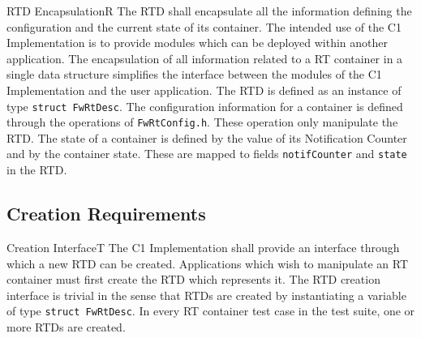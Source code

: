 \documentclass[a4paper,10pt]{article}
\newenvironment{fw_req}[6]
{\addtocounter{subsubsection}{1}
	\hspace{0.2cm}\textbf{FW-\arabic{section}.\arabic{subsection}.\arabic{subsubsection}/#2
	\hspace{0.8cm} #1}
	\vspace{-10pt}
\begin{longtable}{p{2.7cm}P{8.5cm}}
\hline
\textsc{Requirement} & #3 \\
\textsc{Justification} & #4 \\
\textsc{Implementation} & #5  \\ 
\textsc{Verification} & #6  \\
\hline
}
{\end{longtable}}
\begin{document}
\begin{fw_req}{RTD Encapsulation}{R}
{The RTD shall encapsulate all the information defining the configuration and the current state of its container.}
{The intended use of the C1 Implementation is to provide modules which can be deployed within another application. The encapsulation of all information related to a RT container in a single data structure simplifies the interface between the modules of the C1 Implementation and the user application.}
{The RTD is defined as an instance of type \texttt{struct FwRtDesc}.} 
{The configuration information for a container is defined through the operations of \texttt{FwRtConfig.h}. These operation only manipulate the RTD. The state of a container is defined by the value of its Notification Counter and by the container state. These are mapped to fields \texttt{notifCounter} and \texttt{state} in the RTD.}
\end{fw_req}  

\subsection{Creation Requirements}\label{req:creationInterfaceRTD}

\begin{fw_req}{Creation Interface}{T}
{ The C1 Implementation shall provide an interface through which a new RTD 
can be created.}
{Applications which wish to manipulate an RT container must first create the 
RTD which represents it.}
{The RTD creation interface is trivial in the sense that RTDs are created by instantiating a variable of type \texttt{struct FwRtDesc}.} 
{In every RT container test case in the test suite, one or more RTDs are created.}
\end{fw_req}
\end{document}
